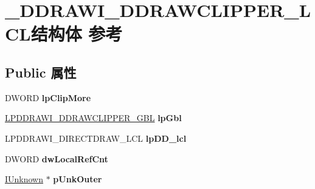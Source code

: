 \hypertarget{struct___d_d_r_a_w_i___d_d_r_a_w_c_l_i_p_p_e_r___l_c_l}{}\section{\+\_\+\+D\+D\+R\+A\+W\+I\+\_\+\+D\+D\+R\+A\+W\+C\+L\+I\+P\+P\+E\+R\+\_\+\+L\+C\+L结构体 参考}
\label{struct___d_d_r_a_w_i___d_d_r_a_w_c_l_i_p_p_e_r___l_c_l}
\subsection*{Public 属性}
\begin{DoxyCompactItemize}
\item 
\mbox{\label{struct___d_d_r_a_w_i___d_d_r_a_w_c_l_i_p_p_e_r___l_c_l_a1d29d81836fef4838fbf6b04bbe52081}} 
D\+W\+O\+RD {\bfseries lp\+Clip\+More}
\item 
\mbox{\label{struct___d_d_r_a_w_i___d_d_r_a_w_c_l_i_p_p_e_r___l_c_l_a2b1bc6edc4fc05c653167dc19ae89ec6}} 
\hyperlink{struct___d_d_r_a_w_i___d_d_r_a_w_c_l_i_p_p_e_r___g_b_l}{L\+P\+D\+D\+R\+A\+W\+I\+\_\+\+D\+D\+R\+A\+W\+C\+L\+I\+P\+P\+E\+R\+\_\+\+G\+BL} {\bfseries lp\+Gbl}
\item 
\mbox{\label{struct___d_d_r_a_w_i___d_d_r_a_w_c_l_i_p_p_e_r___l_c_l_a85c601cb29a9f383773d0b987d3a407c}} 
L\+P\+D\+D\+R\+A\+W\+I\+\_\+\+D\+I\+R\+E\+C\+T\+D\+R\+A\+W\+\_\+\+L\+CL {\bfseries lp\+D\+D\+\_\+lcl}
\item 
\mbox{\label{struct___d_d_r_a_w_i___d_d_r_a_w_c_l_i_p_p_e_r___l_c_l_a8b8af5d4131465e415bd167a5a3dab36}} 
D\+W\+O\+RD {\bfseries dw\+Local\+Ref\+Cnt}
\item 
\mbox{\label{struct___d_d_r_a_w_i___d_d_r_a_w_c_l_i_p_p_e_r___l_c_l_a9548bfdbec99278251196880f7084329}} 
\hyperlink{interface_i_unknown}{I\+Unknown} $\ast$ {\bfseries p\+Unk\+Outer}
\item 
\mbox{\label{struct___d_d_r_a_w_i___d_d_r_a_w_c_l_i_p_p_e_r___l_c_l_a01c2b923c30fcee02308245a0d854c3c}} 

\end{DoxyCompactItemize}
